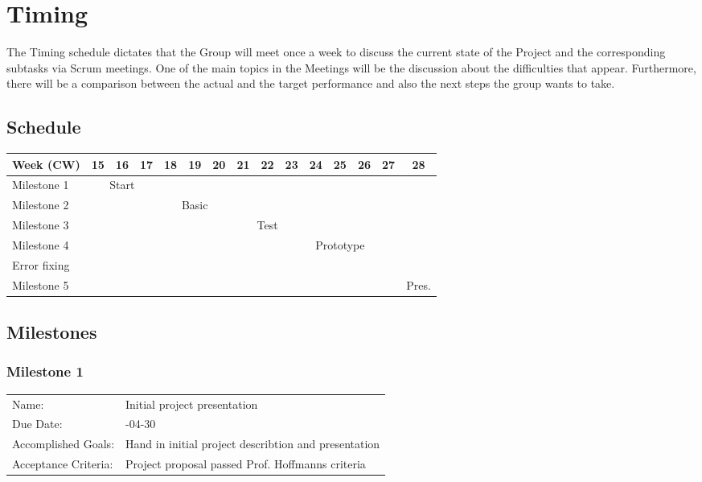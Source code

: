 \documentclass[a4paper, 12pt]{scrartcl}%
\newcommand{\explanation}[1]{{\sffamily #1}}
\begin{document}
\section{Timing}
The Timing schedule dictates that the Group will meet once a week to discuss the current state of the Project and the corresponding subtasks via Scrum meetings. One of the main topics in the Meetings will be the discussion about the difficulties that appear. Furthermore, there will be a comparison between the actual and the target performance and also the next steps the group wants to take.\newline


\subsection*{Schedule}
\begin{center}
	\begin{footnotesize}
		\begin{tabular}{|l|c|c|c|c|c|c|c|c|c|c|c|c|c|c|}
			\hline
			Week (CW) & 15 & 16 & 17 & 18 & 19 & 20 & 21 & 22 & 23 & 24 & 25 & 26 & 27 & 28 \\
			\hline
			Milestone 1      & \multicolumn{3}{c|}{Start}&\multicolumn{11}{c|}{}\\
			\hline
			Milestone 2      & \multicolumn{3}{c|}{}&\multicolumn{3}{c|}{Basic}&\multicolumn{8}{c|}{}\\
			\hline
			Milestone 3      & \multicolumn{6}{c|}{}&\multicolumn{3}{c|}{Test}&\multicolumn{5}{c|}{}\\
			\hline
			Milestone 4      & \multicolumn{9}{c|}{}&\multicolumn{3}{c|}{Prototype}&\multicolumn{2}{c|}{}\\
			\hline
			Error fixing     & \multicolumn{12}{c|}{}&\multicolumn{1}{c|}{}&\multicolumn{1}{c|}{}\\
			\hline
			Milestone 5      & \multicolumn{13}{c|}{}&\multicolumn{1}{c|}{Pres.}\\
			\hline
		\end{tabular}
	\end{footnotesize}
\end{center}

\subsection{Milestones}
\subsubsection*{Milestone 1}
\begin{tabular}{lp{10cm}}
	Name:      & \explanation{Initial project presentation}\\
	Due Date: & \explanation{2019-04-30}\\
	Accomplished Goals: & \explanation{Hand in initial project describtion and presentation}\\
	Acceptance Criteria: & \explanation{Project proposal passed Prof. Hoffmanns criteria}
\end{tabular}
\end{document}
